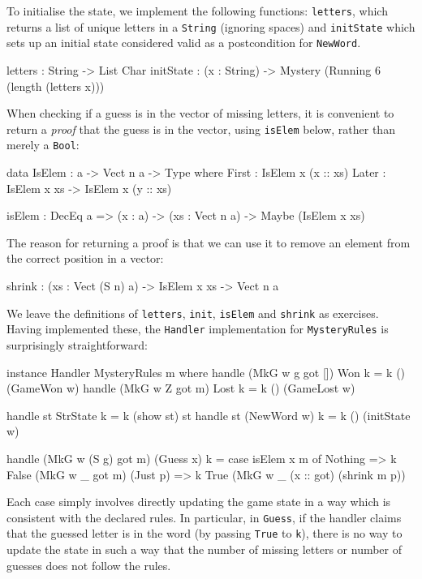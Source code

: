 To initialise the state, we implement the following functions: \texttt{letters},
which returns a list of unique letters in a \texttt{String} (ignoring spaces)
and \texttt{initState} which sets up an initial state considered valid as a
postcondition for \texttt{NewWord}.

\begin{code}
letters : String -> List Char
initState : (x : String) -> Mystery (Running 6 (length (letters x)))
\end{code}

\noindent
When checking if a guess is in the vector of missing letters, it is convenient
to return a \emph{proof} that the guess is in the vector, using \texttt{isElem}
below, rather than merely a \texttt{Bool}:

\begin{code}
data IsElem : a -> Vect n a -> Type where
     First : IsElem x (x :: xs)
     Later : IsElem x xs -> IsElem x (y :: xs)

isElem : DecEq a => (x : a) -> (xs : Vect n a) -> Maybe (IsElem x xs)
\end{code}

\noindent
The reason for returning a proof is that we can use it to remove an element
from the correct position in a vector:

\begin{code}
shrink : (xs : Vect (S n) a) -> IsElem x xs -> Vect n a
\end{code}

\noindent
We leave the definitions of \texttt{letters}, \texttt{init}, \texttt{isElem}
and \texttt{shrink} as exercises. Having implemented these, the \texttt{Handler}
implementation for \texttt{MysteryRules} is surprisingly straightforward:

\begin{code}
instance Handler MysteryRules m where
    handle (MkG w g got []) Won k = k () (GameWon w)
    handle (MkG w Z got m) Lost k = k () (GameLost w)
  
    handle st StrState k = k (show st) st
    handle st (NewWord w) k = k () (initState w)
  
    handle (MkG w (S g) got m) (Guess x) k =
        case isElem x m of
             Nothing => k False (MkG w _ got m)
             (Just p) => k True (MkG w _ (x :: got) (shrink m p))
\end{code}

\noindent
Each case simply involves directly updating the game state in a way which
is consistent with the declared rules. In particular, in \texttt{Guess}, if
the handler claims that the guessed letter is in the word (by passing
\texttt{True} to \texttt{k}), there is no way to update the state in such
a way that the number of missing letters or number of guesses does not
follow the rules.

